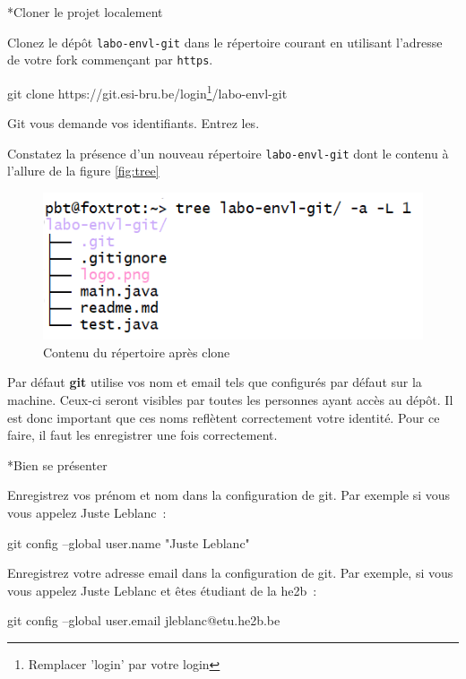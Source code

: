 \documentclass[a4paper,11pt]{style-esi/td}
\newcommand{\git}{\textbf{git }}
\begin{document}
\begin{Exercice}*{Cloner le projet localement}
	\begin{steps}
		
	\item Clonez le dépôt \texttt{labo-envl-git} dans le répertoire courant en
		utilisant l'adresse de votre fork commençant par \texttt{https}. 

		\begin{term}
			git clone https://git.esi-bru.be/login\footnote{Remplacer 'login' par votre login}/labo-envl-git
		\end{term}

		Git vous demande vos identifiants. Entrez les.  

	\item Constatez la présence d'un nouveau répertoire \texttt{labo-envl-git} dont le contenu à l'allure de la figure \vref{fig:tree}

		\begin{figure}[h]
			\centering
			\includegraphics[width=.7\linewidth]{img/tree.png}
			\caption{Contenu du répertoire après clone}
			\label{fig:tree}
		\end{figure}
	
	\end{steps}
\end{Exercice}

Par défaut \git utilise vos nom et email tels que configurés par défaut sur la
machine. Ceux-ci seront visibles par toutes les personnes ayant accès au dépôt.
Il est donc important que ces noms reflètent correctement votre identité. Pour
ce faire, il faut les enregistrer une fois correctement. 

\begin{Exercice}*{Bien se présenter}
	\begin{steps}

	\item Enregistrez vos prénom et nom dans la configuration de git. Par
		exemple si vous vous appelez Juste Leblanc~:

	\begin{term}
		git config --global user.name "Juste Leblanc"
	\end{term}
	
	\item Enregistrez votre adresse email dans la configuration de git. Par
		exemple, si vous vous appelez Juste Leblanc et êtes étudiant de la he2b~:

	\begin{term}
		git config --global user.email jleblanc@etu.he2b.be
	\end{term}

	\end{steps}
\end{Exercice}
\end{document}
